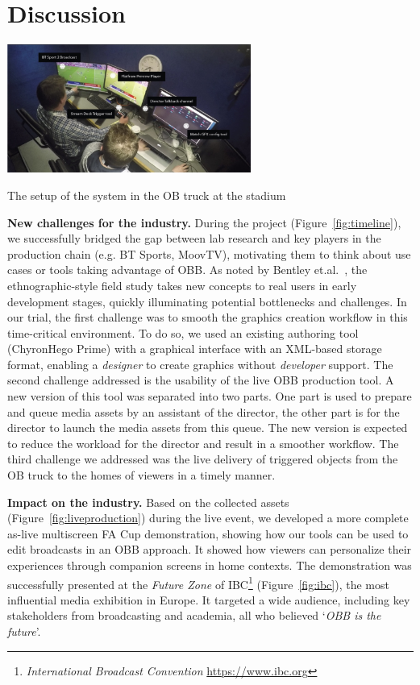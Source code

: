 \documentclass[sigchi-a]{acmart}
\begin{document}
\section{Discussion}

\begin{marginfigure}
    \vspace{-12pc}
    \hspace*{-1cm}
    \includegraphics[width=8cm]{Figures/liveproduction.jpg}
    \caption{The setup of the system in the OB truck at the stadium}
    \label{fig:liveproduction}
\end{marginfigure}

\textbf{New challenges for the industry.} During the project
(Figure~\ref{fig:timeline}), we successfully bridged the gap between lab
research and key players in the production chain (e.g. BT Sports, MoovTV),
motivating them to think about use cases or tools taking advantage of
OBB\@. As noted by Bentley et.al.~\cite{bentley2009}, the ethnographic-style
field study takes new concepts to real users in early development stages,
quickly illuminating potential bottlenecks and challenges. In our trial, the
first challenge was to smooth the graphics creation workflow in this
time-critical environment. To do so, we used an existing authoring tool
(ChyronHego Prime) with a graphical interface with an XML-based storage format,
enabling a \textit{designer} to create graphics without \textit{developer} support.
The second challenge addressed is the usability of the live OBB production
tool. A new version of this tool was separated into two parts. One part is
used to prepare and queue media assets by an assistant of the director, the
other part is for the director to launch the media assets from this queue. The new
version is expected to reduce the workload for the director and result in a
smoother workflow. The third challenge we addressed was the live delivery of
triggered objects from the OB truck to the homes of viewers in a timely
manner.

\vspace{5pt}\noindent\textbf{Impact on the industry.} Based on the collected assets
(Figure~\ref{fig:liveproduction}) during the live event, we developed a more complete as-live multiscreen
FA Cup demonstration, showing how our tools can be used to edit broadcasts
in an OBB approach. It showed how viewers can personalize their experiences
through companion screens in home contexts. The demonstration was successfully
presented at the \emph{Future Zone} of IBC\footnote{\emph{International Broadcast Convention} \url{https://www.ibc.org}} (Figure~\ref{fig:ibc}), the most
influential media exhibition in Europe. It targeted a wide audience, including
key stakeholders from broadcasting and academia, all who believed `\emph{OBB is the future}'.
\end{document}
